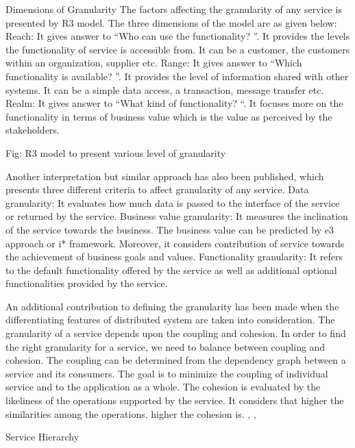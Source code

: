 Dimensions of Granularity
The factors affecting the granularity of any service is presented by R3 model. The three dimensions of the model are as given below:
Reach: It gives answer to “Who can use the functionality? ”.  It provides the levels the functionality of service is accessible from. It can be a customer, the customers within an organization, supplier etc.
Range: It gives answer to “Which functionality is available? ”. It provides the level of information shared with other systems. It can be a simple data access, a transaction, message transfer etc. 
Realm: It gives answer to “What kind of functionality? “.  It focuses more on the functionality in terms of business value which is the value as perceived by the stakeholders. \cite{Pierre-Reldin:2007aa}


 
Fig: R3 model to present various level of granularity


Another interpretation but similar approach has also been published, which presents three different criteria to affect granularity of any service. 
Data granularity: It evaluates how much data is passed to the interface of the service or returned by the service. 
Business value granularity:  It measures the inclination of the service towards the business. The business value can be predicted by e3 approach or i* framework.  Moreover, it considers contribution of service towards the achievement of business goals and values.
Functionality granularity: It refers to the default functionality offered by the service as well as additional optional functionalities provided by the service.
\cite{Raf-Haesen:2015aa}

An additional contribution to defining the granularity has been made when the differentiating features of distributed system are taken into consideration. The granularity of a service depends upon the coupling and cohesion. In order to find the right granularity for a service, we need to balance between coupling and cohesion.
The coupling can be determined from the dependency graph between a service and its consumers. The goal is to minimize the coupling of individual service and to the application as a whole.
The cohesion is evaluated by the likeliness of the operations supported by the service. It considers that higher the similarities among the operations, higher the cohesion is.  \cite{Xiao-jun:2015aa}, \cite{Mikhail-Perepletchikov:2015aa}, \cite{Bingu-Shim:2008aa}

Service Hierarchy

 